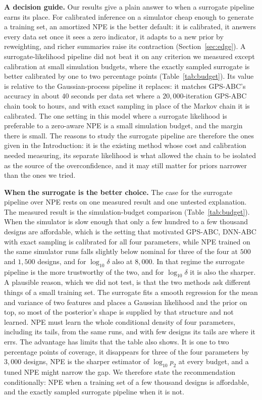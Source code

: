\documentclass[sn-basic,iicol,pdflatex]{sn-jnl}
\begin{document}
\noindent\textbf{A decision guide.} Our results give a plain answer to when a surrogate pipeline earns its place. For calibrated inference on a simulator cheap enough to generate a training set, an amortized NPE is the better default: it is calibrated, it answers
every data set once it sees a zero indicator, it adapts to a new prior by reweighting, and richer summaries raise its contraction (Section~\ref{sec:edge}). A surrogate-likelihood pipeline did not beat it on any criterion we measured except calibration at small simulation budgets, where the exactly sampled surrogate is better calibrated by one to two percentage points (Table~\ref{tab:budget}). Its value is
relative to the Gaussian-process pipeline it replaces: it matches GPS-ABC's accuracy in about $40$ seconds per data set where a $20{,}000$-iteration GPS-ABC chain took \gtrCaseTwoHours{} to \gtrCaseOneHours{} hours, and with exact sampling in place of the Markov chain it is calibrated. The one setting in this model where
a surrogate likelihood is preferable to a zero-aware NPE is a small simulation budget, and the margin there is small. The reasons to study the surrogate pipeline are therefore the ones given in the Introduction: it is the existing method whose cost and calibration needed measuring, its separate likelihood is what allowed the chain to be isolated as the source of the overconfidence, and it may still matter for priors narrower than the ones we tried.

\noindent\textbf{When the surrogate is the better choice.} The case for the surrogate pipeline over NPE rests on one measured result and one untested explanation. The measured result is the simulation-budget comparison (Table~\ref{tab:budget}). When the simulator is slow enough that only a few hundred to a few thousand designs are affordable, which is the setting that motivated GPS-ABC, DNN-ABC with exact sampling is calibrated for all four parameters, while NPE trained on the same simulator runs falls slightly below nominal for three of the four at $500$ and $1{,}500$ designs, and for $\log_{10}\delta$ also at $8{,}000$. In that regime the surrogate pipeline is the more trustworthy of the two, and for $\log_{10}\delta$ it is also the sharper. A plausible reason, which we did not test, is that the two methods ask different things of a small training set. The surrogate fits a smooth regression for the mean and variance of two features and places a Gaussian likelihood and the prior on top, so most of the posterior's shape is supplied by that structure and not learned. NPE must learn the whole conditional density of four parameters, including its tails, from the same runs, and with few designs its tails are where it errs. The advantage has limits that the table also shows. It is one to two percentage points of coverage, it disappears for three of the four parameters by $3{,}000$ designs, NPE is the sharper estimator of $\log_{10}p_2$ at every budget, and a tuned NPE might narrow the gap. We therefore state the recommendation conditionally: NPE when a training set of a few thousand designs is affordable, and the exactly sampled surrogate pipeline when it is not.
\end{document}
